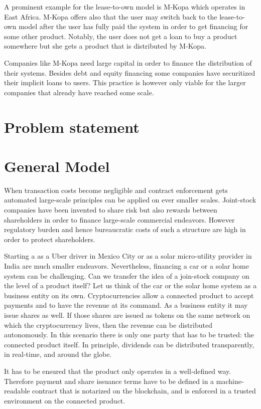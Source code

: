 A prominent example for the lease-to-own model is M-Kopa which operates in East Africa. M-Kopa offers also that the user may switch back to the lease-to-own model after the user has fully paid the system in order to get financing for some other product. Notably, the user does not get a loan to buy a product somewhere but she gets a product that is distributed by M-Kopa. 

Companies like M-Kopa need large capital in order to finance the distribution of their systems. Besides debt and equity financing some companies have securitized their implicit loans to users. This practice is however only viable for the larger companies that already have reached some scale. 

\section{Problem statement}


\section{General Model}

When transaction costs become negligible and contract enforcement gets automated large-scale principles can be applied on ever smaller scales. Joint-stock companies have been invented to share risk but also rewards between shareholders in order to finance large-scale commercial endeavors. However regulatory burden and hence bureaucratic costs of such a structure are high in order to protect shareholders.   

Starting a as a Uber driver in Mexico City or as a solar micro-utility provider in India are much smaller endeavors. Nevertheless, financing a car or a solar home system can be challenging. Can we transfer the idea of a join-stock company on the level of a product itself? Let us think of the car or the solar home system as a business entity on its own. Cryptocurrencies allow a connected product to accept payments and to have the revenue at its command. As a business entity it may issue shares as well. If those shares are issued as tokens on the same network on which the cryptocurrency lives, then the revenue can be distributed autonomously. In this scenario there is only one party that has to be trusted: the connected product itself. In principle, dividends can be distributed transparently, in real-time, and around the globe.

It has to be ensured that the product only operates in a well-defined way. Therefore payment and share issuance terms have to be defined in a machine-readable contract that is notarized on the blockchain, and is enforced in a trusted environment on the connected product. 

